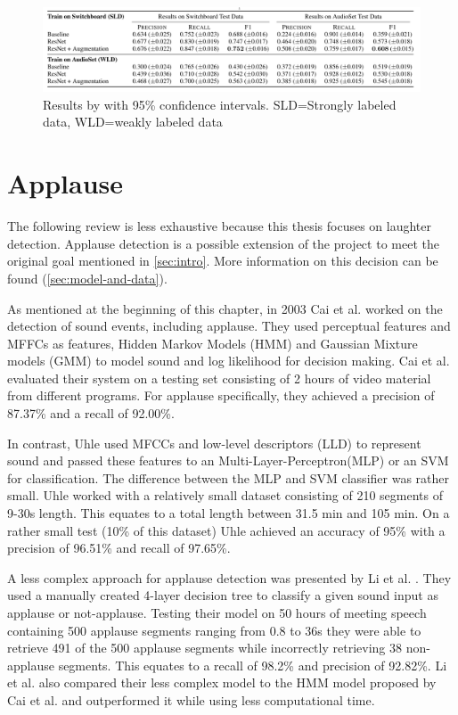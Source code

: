 \documentclass[bsc,frontabs,parskip,deptreport]{infthesis}
\begin{document}
\begin{figure}[h!]
    \centering
    \includegraphics[width=14cm]{imgs/results/gillick_et_al.png}
    \caption{Results by \citet{gillick2021robust} with 95\% confidence intervals. SLD=Strongly labeled data, WLD=weakly labeled data}
    \label{fig:gillick-results}
\end{figure}

\section{Applause}
The following review is less exhaustive because this thesis focuses on laughter detection. Applause detection is a possible extension of the project to meet the original goal mentioned in \autoref{sec:intro}. 
More information on this decision can be found (\autoref{sec:model-and-data}).

As mentioned at the beginning of this chapter, in 2003 Cai et al. \citep{cai2003highlight} worked on the detection of sound events, including applause.
They used perceptual features and MFFCs as features, Hidden Markov Models (HMM) and Gaussian Mixture models (GMM) to model sound and log likelihood for decision making.
Cai et al. evaluated their system on a testing set consisting of 2 hours of video material from different programs.
For applause specifically, they achieved a precision of 87.37\% and a recall of 92.00\%.

In contrast, Uhle \citep{uhle2011applause} used MFCCs and low-level descriptors (LLD) to represent sound and passed these features to an Multi-Layer-Perceptron(MLP) or an SVM for classification.
The difference between the MLP and SVM classifier was rather small.
Uhle worked with a relatively small dataset consisting of 210 segments of 9-30s length. This equates to a total length between 31.5 min and 105 min.
On a rather small test (10\% of this dataset) Uhle achieved an accuracy of 95\% with a precision of 96.51\% and recall of 97.65\%.

A less complex approach for applause detection was presented by Li et al. \citep{li2009characteristics}.
They used a manually created 4-layer decision tree to classify a given sound input as applause or not-applause.
Testing their model on 50 hours of meeting speech containing 500 applause segments ranging from 0.8 to 36s they were able to retrieve 491 of the 500 applause segments while incorrectly retrieving 38 non-applause segments.
This equates to a recall of 98.2\% and precision of 92.82\%. Li et al. also compared their less complex model to the HMM model proposed by Cai et al.\citep{cai2003highlight} and outperformed it while using less computational time.
\end{document}

